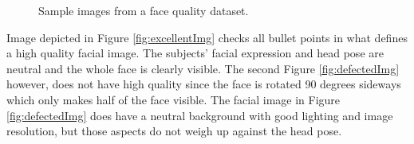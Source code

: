 \begin{figure}[h]
\centering
    \hspace{1.2cm}
    \caption{Sample images from a face quality dataset.}
\end{figure}
\newpage
Image depicted in Figure \ref{fig:excellentImg} checks all bullet points in what defines a high quality facial image. The subjects' facial expression and head pose are neutral and the whole face is clearly visible. The second Figure \ref{fig:defectedImg} however, does not have high quality since the face is rotated 90 degrees sideways which only makes half of the face visible. The facial image in Figure \ref{fig:defectedImg} does have a neutral background with good lighting and image resolution, but those aspects do not weigh up against the head pose.
%

